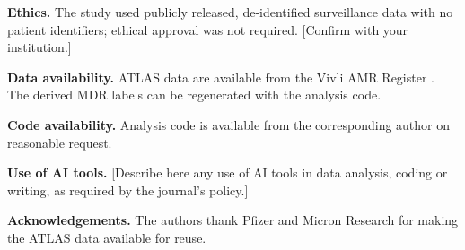\documentclass[11pt,a4paper]{article}
\begin{document}
\noindent\textbf{Ethics.} The study used publicly released, de-identified surveillance data with no patient identifiers; ethical approval was not required. [Confirm with your institution.]

\noindent\textbf{Data availability.} ATLAS data are available from the Vivli AMR Register \cite{vivli}. The derived MDR labels can be regenerated with the analysis code.

\noindent\textbf{Code availability.} Analysis code is available from the corresponding author on reasonable request.

\noindent\textbf{Use of AI tools.} [Describe here any use of AI tools in data analysis, coding or writing, as required by the journal's policy.]

\noindent\textbf{Acknowledgements.} The authors thank Pfizer and Micron Research for making the ATLAS data available for reuse.
\end{document}
